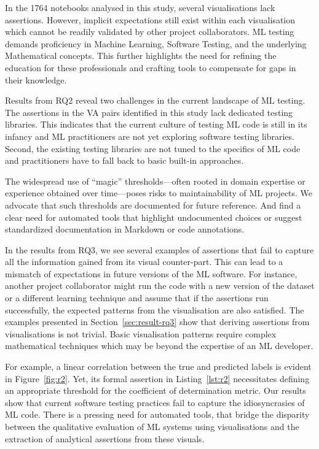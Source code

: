 In the 1764 notebooks analysed in this study, several visualisations
lack assertions. However, implicit expectations still exist within
each visualisation which cannot be readily validated by other project
collaborators. ML testing demands proficiency in Machine Learning,
Software Testing, and the underlying Mathematical concepts. This
further highlights the need for refining the education for these
professionals and crafting tools to compensate for gaps in their
knowledge.

Results from RQ2 reveal two challenges in the current landscape of ML
testing. The assertions in the VA pairs identified in this study lack
dedicated testing libraries. This indicates that the current culture
of testing ML code is still in its infancy and ML practitioners are
not yet exploring software testing libraries. Second, the existing
testing libraries are not tuned to the specifics of ML code and
practitioners have to fall back to basic built-in approaches.

The widespread use of ``magic'' thresholds---often rooted in domain
expertise or experience obtained over time---poses risks to
maintainability of ML projects. We advocate that such thresholds are
documented for future reference. And find a clear need for automated
tools that highlight undocumented choices or suggest standardized
documentation in Markdown or code annotations.

In the results from RQ3, we see several examples of assertions that
fail to capture all the information gained from its visual
counter-part. This can lead to a mismatch of expectations in future
versions of the ML software. For instance, another project
collaborator might run the code with a new version of the dataset or a
different learning technique and assume that if the assertions run
successfully, the expected patterns from the visualisation are also
satisfied. The examples presented in Section~\ref{sec:result-rq3} show
that deriving assertions from visualisations is not trivial. Basic
visualisation patterns require complex mathematical techniques which
may be beyond the expertise of an ML developer.

For example, a linear correlation between the true and predicted
labels is evident in Figure~\ref{fig:r2}. Yet, its formal assertion in
Listing~\ref{lst:r2} necessitates defining an appropriate threshold
for the coefficient of determination metric. Our results show that
current software testing practices fail to capture the idiosyncrasies
of ML code. There is a pressing need for automated tools, that bridge
the disparity between the qualitative evaluation of ML systems using
visualisations and the extraction of analytical assertions from these
visuals.





